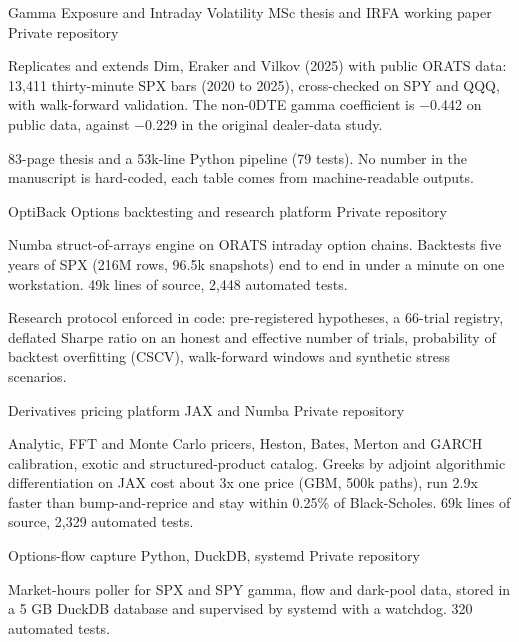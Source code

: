 \begin{cventries}
  \cvrow
    {Gamma Exposure and Intraday Volatility}
    {MSc thesis and IRFA working paper}
    {Private repository}
    {
      \begin{cvitems}
        \item{Replicates and extends Dim, Eraker and Vilkov (2025) with public ORATS data: 13,411 thirty-minute SPX bars (2020 to 2025), cross-checked on SPY and QQQ, with walk-forward validation. The non-0DTE gamma coefficient is $-$0.442 on public data, against $-$0.229 in the original dealer-data study.}
        \item{83-page thesis and a 53k-line Python pipeline (79 tests). No number in the manuscript is hard-coded, each table comes from machine-readable outputs.}
      \end{cvitems}
    }
  \cvrow
    {OptiBack}
    {Options backtesting and research platform}
    {Private repository}
    {
      \begin{cvitems}
        \item{Numba struct-of-arrays engine on ORATS intraday option chains. Backtests five years of SPX (216M rows, 96.5k snapshots) end to end in under a minute on one workstation. 49k lines of source, 2,448 automated tests.}
        \item{Research protocol enforced in code: pre-registered hypotheses, a 66-trial registry, deflated Sharpe ratio on an honest and effective number of trials, probability of backtest overfitting (CSCV), walk-forward windows and synthetic stress scenarios.}
      \end{cvitems}
    }
  \cvrow
    {Derivatives pricing platform}
    {JAX and Numba}
    {Private repository}
    {
      \begin{cvitems}
        \item{Analytic, FFT and Monte Carlo pricers, Heston, Bates, Merton and GARCH calibration, exotic and structured-product catalog. Greeks by adjoint algorithmic differentiation on JAX cost about 3x one price (GBM, 500k paths), run 2.9x faster than bump-and-reprice and stay within 0.25\% of Black-Scholes. 69k lines of source, 2,329 automated tests.}
      \end{cvitems}
    }
  \cvrow
    {Options-flow capture}
    {Python, DuckDB, systemd}
    {Private repository}
    {
      \begin{cvitems}
        \item{Market-hours poller for SPX and SPY gamma, flow and dark-pool data, stored in a 5 GB DuckDB database and supervised by systemd with a watchdog. 320 automated tests.}

\end{cvitems}}
\end{cventries}
